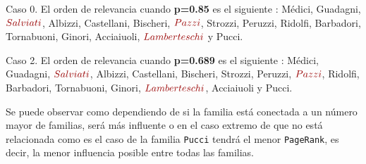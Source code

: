 \par Caso 0. El orden de relevancia cuando \textbf{p=0.85} es el siguiente : Médici, Guadagni, $\color{rojoOscuro}{Salviati}$, Albizzi, Castellani, Bischeri, $\color{rojoOscuro}{Pazzi}$, Strozzi, Peruzzi,
Ridolfi, Barbadori, Tornabuoni, Ginori, Acciaiuoli, $\color{rojoOscuro}{Lamberteschi}$ y Pucci.

\par Caso 2. El orden de relevancia cuando \textbf{p=0.689} es el siguiente : Médici, Guadagni, $\color{rojoOscuro}{Salviati}$, Albizzi, Castellani, Bischeri, Strozzi, Peruzzi, $\color{rojoOscuro}{Pazzi}$,
Ridolfi, Barbadori, Tornabuoni, Ginori, $\color{rojoOscuro}{Lamberteschi}$, Acciaiuoli  y Pucci.

\par Se puede observar como dependiendo de si la familia está conectada a un número mayor de familias, será más influente o en 
el caso extremo de que no está relacionada como es el caso de la familia \texttt{Pucci} tendrá el menor \texttt{PageRank}, es decir, 
la menor influencia posible entre todas las familias.
